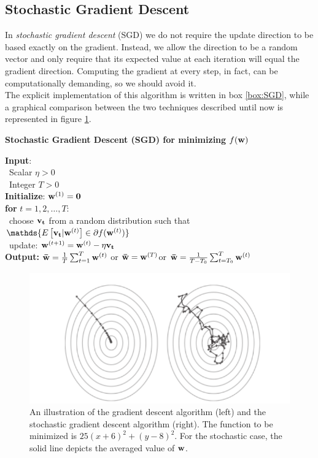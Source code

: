 \documentclass[12pt]{report}
\theoremstyle{plain}
\begin{document}
\begin{flushleft}
\section{Stochastic Gradient Descent}
In \textit{stochastic gradient descent} (SGD) we do not require the update direction to be based exactly on the gradient. Instead, we allow the direction to be a random vector and
only require that its expected value at each iteration will equal the gradient direction. Computing the gradient at every step, in fact, can be computationally demanding, so we should avoid it.\\
The explicit implementation of this algorithm is written in box \ref{box:SGD}, while a graphical comparison between the two techniques described until now is represented in figure \ref{fig:ex_GD}.

\begin{tcolorbox}
	\begin{center}
		\textbf{Stochastic Gradient Descent (SGD) for minimizing $f(\vb{w})$}
	\end{center}
	\textbf{Input}:\\
	\-\ Scalar $\eta>0$\\
	\-\ Integer $T>0$\\
	
	\textbf{Initialize}: \quad $\vb{w}^{(1)}=\vb{0}$\\
	
	\textbf{for} $t=1,2,\dots,T$:\\
	\-\ choose $\vb{v_t}$ from a random distribution such that $\mathds{E\left[\vb{v_t}|\vb{w}^{(t)} \right]\in\partial f(\vb{w}^{(t)})}$\\
	\-\ update: $\vb{w}^{(t+1)} = \vb{w}^{(t)}-\eta\vb{v_t}$ \\
	
	\textbf{Output:} \qquad$\vb{\bar{w}} = \frac{1}{T}\sum_{t=1}^T \vb{w}^{(t)}$ \qquad  or \qquad $\vb{\bar{w}}=\vb{w}^{(T)}$\qquad   or  \qquad $\vb{\bar{w}} = \frac{1}{T-T_0}\sum_{t=T_0}^T\vb{w}^{(t)}$
	
	\label{box:SGD}
\end{tcolorbox}

\begin{figure}[!h]
	\centering
	\includegraphics[scale=1]{images/ex_gradient_descent.pdf}
	\caption{An illustration of the gradient descent algorithm (left) and the stochastic
		gradient descent algorithm (right). The function to be minimized is $25(x+6)^2+(y-8)^2$. For the stochastic case, the solid line depicts the averaged value of $\vb{w}$.}
	\label{fig:ex_GD}
\end{figure}


\end{flushleft}
\end{document}
